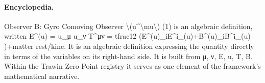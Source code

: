 \paragraph{Encyclopedia.}
Observer B: Gyro Comoving Observer \textbackslash{}(u\textasciicircum{}\textbackslash{}mu\textbackslash{}) (1) is an algebraic definition, written E\textasciicircum{}(u) = u\_μ u\_ν T\textasciicircum{}μν = tfrac12 (E\textasciicircum{}(u)\_iE\textasciicircum{}i\_(u)+B\textasciicircum{}(u)\_iB\textasciicircum{}i\_(u) )+matter rest/kine. It is an algebraic definition expressing the quantity directly in terms of the variables on its right-hand side. It is built from μ, ν, E, u, T, B. Within the Trawin Zero Point registry it serves as one element of the framework's mathematical narrative.
